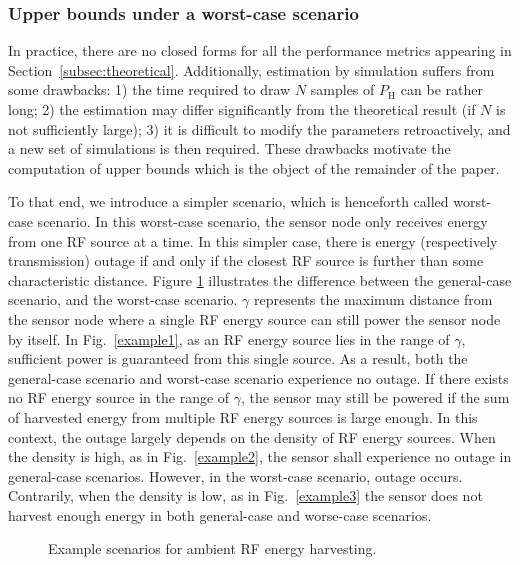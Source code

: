 \documentclass[12pt,draftclsnofoot,onecolumn]{IEEEtran}
\begin{document}
\subsubsection{Upper bounds under a worst-case scenario}
\label{subsec:worstcase}

In practice, there are no closed forms for all the performance metrics appearing in Section~\ref{subsec:theoretical}. Additionally, estimation by simulation suffers from some drawbacks: 1) the time required to draw $N$ samples of $P_{\mathrm H}$ can be rather long; 2) the estimation may differ significantly from the theoretical result (if $N$ is not sufficiently large);
3)	it is difficult to modify the parameters retroactively, and a new set of simulations is then required.
These drawbacks motivate the computation of upper bounds which is the object of the remainder of the paper.

To that end, we introduce a simpler scenario, which is henceforth called worst-case scenario.
In this worst-case scenario, the sensor node only receives energy from one RF source at a time. In this simpler case, there is energy (respectively transmission) outage if and only if the closest RF source is further than some characteristic distance.
Figure \ref{example} illustrates the difference between the general-case scenario, and the worst-case scenario. $\gamma$ represents the maximum distance from the sensor node where a single RF energy source can still power the sensor node by itself. 
In Fig.~\ref{example1}, as an RF energy source lies in the range of $\gamma$, sufficient power is guaranteed from this single source. As a result, both the general-case scenario and worst-case scenario experience no outage. If there exists no RF energy source in the range of $\gamma$, the sensor may still be powered if the sum of harvested energy from multiple RF energy sources is large enough. In this context, the outage largely depends on the density of RF energy sources. When the density is high, as in Fig.~\ref{example2}, the sensor shall experience no outage in general-case scenarios. However, in the worst-case scenario, 
outage occurs. Contrarily, when the density is low, as in Fig.~\ref{example3} the sensor does not harvest enough energy in both general-case and worse-case scenarios.        




\begin{figure} 
\centering
{} 
 \centering
   \centering
    \centering
  \caption{Example scenarios for ambient RF energy harvesting.}
\label{example}
\end{figure}  
\end{document}
